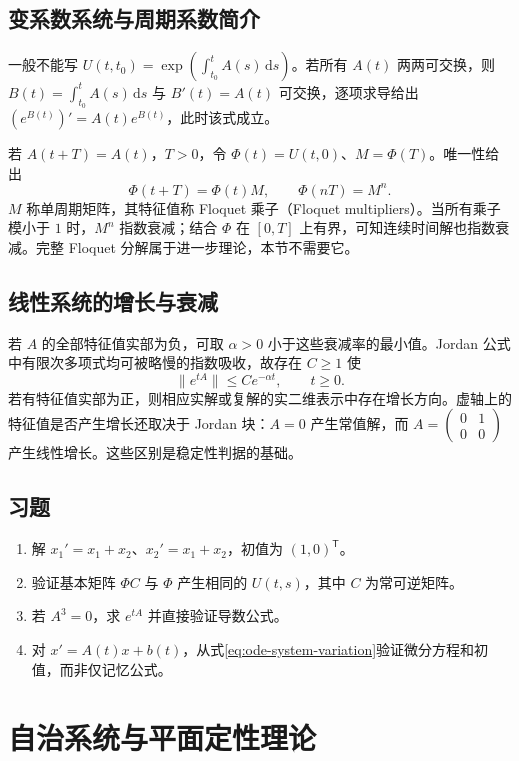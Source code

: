 \documentclass[UTF8,12pt,a4paper,fontset=fandol]{ctexbook}
\begin{document}
\section{变系数系统与周期系数简介}
一般不能写 $U(t,t_0)=\exp(\int_{t_0}^t A(s)\,\mathrm ds)$。若所有 $A(t)$ 两两可交换，则 $B(t)=\int_{t_0}^t A(s)\,\mathrm ds$ 与 $B'(t)=A(t)$ 可交换，逐项求导给出 $(e^{B(t)})'=A(t)e^{B(t)}$，此时该式成立。

若 $A(t+T)=A(t)$，$T>0$，令 $\Phi(t)=U(t,0)$、$M=\Phi(T)$。唯一性给出
\[
 \Phi(t+T)=\Phi(t)M,\qquad \Phi(nT)=M^n.
\]
$M$ 称单周期矩阵，其特征值称 Floquet 乘子（Floquet multipliers）。当所有乘子模小于 $1$ 时，$M^n$ 指数衰减；结合 $\Phi$ 在 $[0,T]$ 上有界，可知连续时间解也指数衰减。完整 Floquet 分解属于进一步理论，本节不需要它。

\section{线性系统的增长与衰减}
若 $A$ 的全部特征值实部为负，可取 $\alpha>0$ 小于这些衰减率的最小值。Jordan 公式中有限次多项式均可被略慢的指数吸收，故存在 $C\geq1$ 使
\[
 \|e^{tA}\|\leq Ce^{-\alpha t},\qquad t\geq0.
\]
若有特征值实部为正，则相应实解或复解的实二维表示中存在增长方向。虚轴上的特征值是否产生增长还取决于 Jordan 块：$A=0$ 产生常值解，而 $A=\begin{pmatrix}0&1\\0&0\end{pmatrix}$ 产生线性增长。这些区别是稳定性判据的基础。

\section{习题}
\begin{enumerate}
 \item\label{ex:ode-system} 解 $x_1'=x_1+x_2$、$x_2'=x_1+x_2$，初值为 $(1,0)^{\mathsf T}$。
 \item 验证基本矩阵 $\Phi C$ 与 $\Phi$ 产生相同的 $U(t,s)$，其中 $C$ 为常可逆矩阵。
 \item\label{ex:ode-nilpotent} 若 $A^3=0$，求 $e^{tA}$ 并直接验证导数公式。
 \item 对 $x'=A(t)x+b(t)$，从式\eqref{eq:ode-system-variation}验证微分方程和初值，而非仅记忆公式。
\end{enumerate}

\chapter{自治系统与平面定性理论}
\label{chap:ode-phase-plane}
\end{document}
